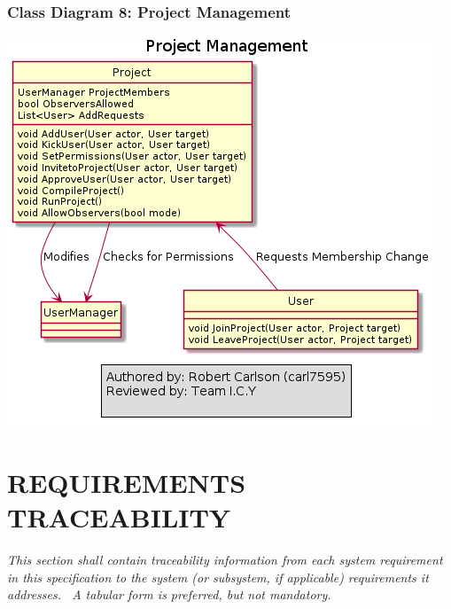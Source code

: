 \documentclass[twoside,letterpaper]{article}
\begin{document}
{\newpage

\subsubsection[Class Diagram 8: Project Management]{\rmfamily\bfseries\color{black}
	Class Diagram 8: Project Management}
\hypertarget{RefHeading22059017292}{}
\bigskip

\includegraphics[width=\textwidth]{images/ClassDiagrams/ProjectManagement}

\subparagraph[]{\rmfamily\color{black} }
\clearpage\setcounter{page}{1}\pagestyle{Convertvi}
\section[REQUIREMENTS TRACEABILITY]{\rmfamily\bfseries\color{black} REQUIREMENTS TRACEABILITY}
\hypertarget{RefHeading28459017292}{}{\itshape\color{black}
This section shall contain traceability information from each system requirement in this specification to the system (or
subsystem, if applicable) requirements it addresses. \ A tabular form is preferred, but not mandatory.}


\bigskip


}
\end{document}
